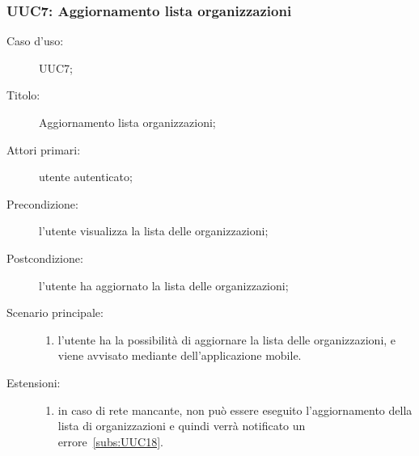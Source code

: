 \documentclass[../../../analisi-dei-requisiti.tex]{subfiles}
\begin{document}
\subsubsection{UUC7: Aggiornamento lista organizzazioni}%
\label{subs:UUC7}
\begin{description}
  \item[Caso d'uso:] UUC7;
  \item[Titolo:] Aggiornamento lista organizzazioni;
  \item[Attori primari:] utente autenticato;
  \item[Precondizione:] l'utente visualizza la lista delle organizzazioni;
  \item[Postcondizione:] l'utente ha aggiornato la lista delle organizzazioni;
  \item[Scenario principale:]
        \begin{enumerate}
          \item l'utente ha la possibilità di aggiornare la lista delle organizzazioni, e viene avvisato mediante  dell'applicazione mobile.
        \end{enumerate}
  \item[Estensioni:]
        \begin{enumerate}
          \item in caso di rete mancante, non può essere eseguito l'aggiornamento della lista di organizzazioni e quindi verrà notificato un errore~\ref{subs:UUC18}.
        \end{enumerate}
\end{description}
\end{document}
